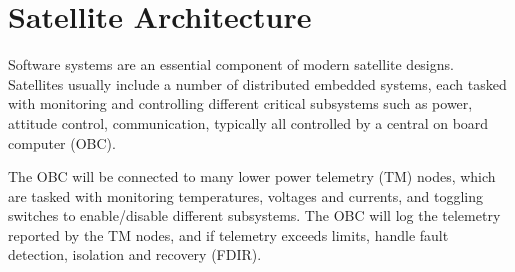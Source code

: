 \documentclass[../report.tex]{subfiles}
\begin{document}

\section{Satellite Architecture}

Software systems are an essential component of modern satellite designs.
Satellites usually include a number of distributed embedded systems, each
tasked with monitoring and controlling different critical subsystems such as
power, attitude control, communication, typically all controlled by a
central on board computer (OBC).


The OBC will be connected to many lower power telemetry (TM) nodes, which are
tasked with monitoring temperatures, voltages and currents, and toggling switches
to enable/disable different subsystems. The OBC will log the telemetry reported
by the TM nodes, and if telemetry exceeds limits, handle fault detection,
isolation and recovery (FDIR).
\end{document}
